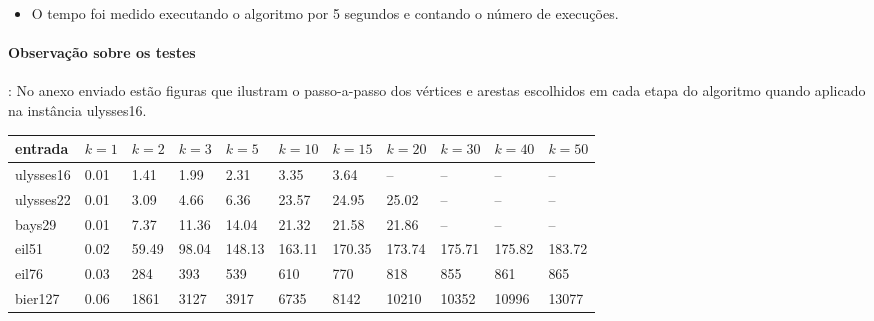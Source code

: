\documentclass[paper=a4, fontsize=11pt]{scrartcl} %
\numberwithin{equation}{section} %
\numberwithin{figure}{section} %
\numberwithin{table}{section} %
\begin{document}
\begin{itemize}
   \item O tempo foi medido executando o algoritmo por 5 segundos e contando o número de execuções.
\end{itemize}

\paragraph{Observação sobre os testes}: No anexo enviado estão figuras que ilustram o passo-a-passo dos vértices e arestas escolhidos em cada etapa do algoritmo quando aplicado na instância ulysses16.

\begin{table}[H]
\centering
\begin{tabular}{l|l|l|l|l|l|l|l|l|l|l}
entrada & $k=1$ & $k=2$ & $k=3$ & $k=5$ & $k=10$ & $k=15$ & $k=20$ & $k=30$ & $k=40$ & $k=50$ \\\hline
ulysses16 & 0.01 & 1.41 & 1.99 & 2.31 & 3.35 & 3.64 & -- & -- & -- & -- \\
ulysses22 & 0.01 & 3.09 & 4.66 & 6.36 & 23.57 & 24.95 & 25.02 & -- & -- & -- \\
bays29 & 0.01 & 7.37 & 11.36 & 14.04 & 21.32 & 21.58 & 21.86 & -- & -- & -- \\
eil51 & 0.02 & 59.49 & 98.04 & 148.13 & 163.11 & 170.35 & 173.74 & 175.71 & 175.82 & 183.72 \\
eil76 & 0.03 & 284 & 393 & 539 & 610 & 770 & 818 & 855 & 861 & 865 \\
bier127 & 0.06 & 1861 & 3127 & 3917 & 6735 & 8142 & 10210 & 10352 & 10996 & 13077
\end{tabular}
\end{table}

\end{document}
